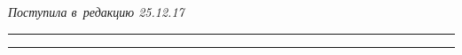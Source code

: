 \vspace*{-6pt}





\hfill{\small\textit{Поступила в~редакцию 25.12.17}}














\vspace*{6pt}





\hrule





\vspace*{2pt}















\hrule
















\def\tit{RECOVERY OF SIGNAL IN SYSTEMS OF~REAL TIME ON~UNIFORM SELECTIONS 


WITH~REDUCTION\\ 


OF~NYQUIST INTERVAL}





\def\titkol{Recovery of signal in systems of~real time on~uniform selections with~reduction 


of %


interval}








\def\aut{B.\,G.~Mayorov}


\def\autkol{B.\,G.~Mayorov}











